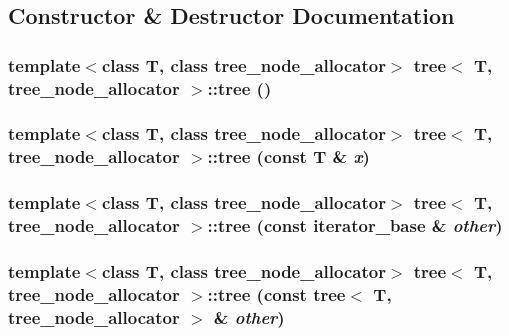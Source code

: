 \subsection{Constructor \& Destructor Documentation}
\hypertarget{classtree_a064a1d9dceac9b918c5247919a4a325}{
\subsubsection{\setlength{\rightskip}{0pt plus 5cm}template$<$class T, class tree\_\-node\_\-allocator$>$ {\bf tree}$<$ T, tree\_\-node\_\-allocator $>$::{\bf tree} ()}}
\label{classtree_a064a1d9dceac9b918c5247919a4a325}


\hypertarget{classtree_5925c012af64fe91a3a5ed39e3ba9d9a}{
\subsubsection{\setlength{\rightskip}{0pt plus 5cm}template$<$class T, class tree\_\-node\_\-allocator$>$ {\bf tree}$<$ T, tree\_\-node\_\-allocator $>$::{\bf tree} (const T \& {\em x})}}
\label{classtree_5925c012af64fe91a3a5ed39e3ba9d9a}


\hypertarget{classtree_b72378e7a772a82f90d91ef7493f27bc}{
\subsubsection{\setlength{\rightskip}{0pt plus 5cm}template$<$class T, class tree\_\-node\_\-allocator$>$ {\bf tree}$<$ T, tree\_\-node\_\-allocator $>$::{\bf tree} (const {\bf iterator\_\-base} \& {\em other})}}
\label{classtree_b72378e7a772a82f90d91ef7493f27bc}


\hypertarget{classtree_e9e06b40929dfd33a1024bd422beedb6}{
\subsubsection{\setlength{\rightskip}{0pt plus 5cm}template$<$class T, class tree\_\-node\_\-allocator$>$ {\bf tree}$<$ T, tree\_\-node\_\-allocator $>$::{\bf tree} (const {\bf tree}$<$ T, tree\_\-node\_\-allocator $>$ \& {\em other})}}
\label{classtree_e9e06b40929dfd33a1024bd422beedb6}


